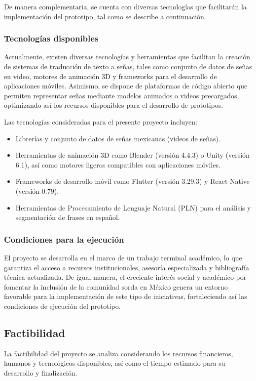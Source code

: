 De manera complementaria, se cuenta con diversas tecnologías que facilitarán la implementación del prototipo, tal como se describe a continuación.

\subsubsection{Tecnologías disponibles}
Actualmente, existen diversas tecnologías y herramientas que facilitan la creación de sistemas de traducción de texto a señas, tales como conjunto de datos de señas en video, motores de animación 3D y frameworks para el desarrollo de aplicaciones móviles. Asimismo, se dispone de plataformas de código abierto que permiten representar señas mediante modelos animados o videos precargados, optimizando así los recursos disponibles para el desarrollo de prototipos.

Las tecnologías consideradas para el presente proyecto incluyen:
\begin{itemize} 
	\item Librerías y conjunto de datos de señas mexicanas (videos de señas). 
	\item Herramientas de animación 3D como Blender (versión 4.4.3) o Unity (versión 6.1), así como motores ligeros compatibles con aplicaciones móviles. 
	\item Frameworks de desarrollo móvil como Flutter (versión 3.29.3) y React Native (versión 0.79). 
	\item Herramientas de Procesamiento de Lenguaje Natural (PLN) para el análisis y segmentación de frases en español. 
\end{itemize}

\subsubsection{Condiciones para la ejecución}
El proyecto se desarrolla en el marco de un trabajo terminal académico, lo que garantiza el acceso a recursos institucionales, asesoría especializada y bibliografía técnica actualizada. De igual manera, el creciente interés social y académico por fomentar la inclusión de la comunidad sorda en México genera un entorno favorable para la implementación de este tipo de iniciativas, fortaleciendo así las condiciones de ejecución del prototipo.

\subsection{Factibilidad}
La factibilidad del proyecto se analiza considerando los recursos financieros, humanos y tecnológicos disponibles, así como el tiempo estimado para su desarrollo y finalización.


